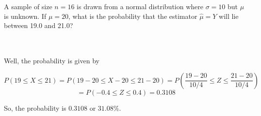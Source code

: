 A sample of size $n=16$ is drawn from a normal distribution where $\sigma=10$ but $\mu$ is unknown. If
$\mu=20$, what is the probability that the estimator $\hat{\mu}=Y$ will lie between 19.0 and 21.0?\\\\

\begin{solution}\renewcommand{\qedsymbol}{}\ \\
    Well, the probability is given by
    
    $$P(19\leq X\leq21)=P(19-20\leq X-20\leq21-20)=P(\frac{19-20}{10/4}\leq Z\leq\frac{21-20}{10/4})$$
    $$=P(-0.4\leq Z\leq0.4)=0.3108$$
    
    So, the probability is $0.3108$ or $31.08\%$.

\end{solution}